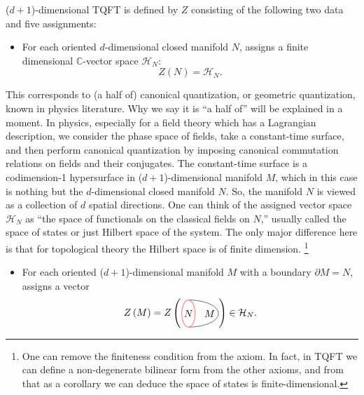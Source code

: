 ($d+1$)-dimensional TQFT is defined by $Z$ consisting of the following
two data and five assignments:
\begin{itemize}
  \item For each oriented $d$-dimensional closed manifold $N$, assigns a
finite dimensional $\mathbb{C}$-vector space $\mathcal{H}_{N}$:
\begin{equation}
  Z\left(N\right)  =  \mathcal{H}_{N}.
\end{equation}
\end{itemize}
This corresponds to (a half of) canonical quantization, or geometric
quantization, known in physics literature. Why we say it is ``a half
of'' will be explained in a moment. In physics, especially for a
field theory which has a Lagrangian description, we consider the phase
space of fields, take a constant-time surface, and then perform canonical
quantization by imposing canonical commutation relations on fields
and their conjugates. The constant-time surface is a codimension-1
hypersurface in ($d+1$)-dimensional manifold $M$, which in this
case is nothing but the $d$-dimensional closed manifold $N$. So,
the manifold $N$ is viewed as a collection of $d$ spatial directions.
One can think of the assigned vector space $\mathcal{H}_{N}$ as ``the
space of functionals on the classical fields on $N$,'' usually called
the space of states or just Hilbert space of the system. The only
major difference here is that for topological theory the Hilbert space
is of finite dimension.%
%
\footnote{One can remove the finiteness condition from the axiom. In fact, in
TQFT we can define a non-degenerate bilinear form from the other axioms,
and from that as a corollary we can deduce the space of states is
finite-dimensional. }
%
\begin{itemize}
  \item For each oriented ($d+1$)-dimensional manifold $M$ with a boundary
$\partial M=N$, assigns a vector
\begin{equation}
  Z\left(M\right)
  =
  Z\left(
    \begin{tikzpicture}[scale=0.6, baseline=(x.base)]    \node (x) at (0,0) {\vphantom{x}};
        \def\bdyradius{0.8cm}

        \draw (0,-\bdyradius) arc[start angle=-90,end angle=90,x radius=1.8cm,y radius=\bdyradius] node[left=0.1,pos=0.5] {$M$};
        \draw[thick, red!50] (0,0) node[black] {$N$} circle[x radius=0.4cm,y radius=\bdyradius];

    \end{tikzpicture}
  \right)
  \in  \mathcal{H}_{N}.
\end{equation}
\end{itemize}
